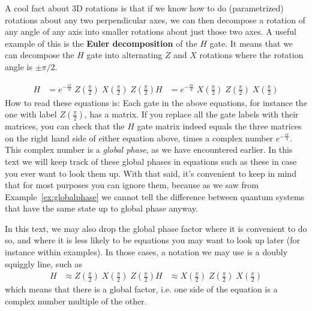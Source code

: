 \documentclass{article}
\theoremstyle{definition}
\begin{document}
A cool fact about 3D rotations is that if we know how to do (parametrized) rotations about any two perpendicular axes, we can then decompose a rotation of any angle of any axis into smaller rotations about just those two axes.
A useful example of this is the \textbf{Euler decomposition} of the $H$ gate.  It means that we can decompose the $H$ gate into alternating $Z$ and $X$ rotations where the rotation angle is $\pm \pi/2$.

\begin{align}
	H &= e^{-\frac{i\pi}{4}} \; Z\left(\frac{\pi}{2}\right) \; X\left(\frac{\pi}{2}\right) \; Z\left(\frac{\pi}{2}\right)
	H &= e^{-\frac{i\pi}{4}} \; X\left(\frac{\pi}{2}\right) \; Z\left(\frac{\pi}{2}\right) \; X\left(\frac{\pi}{2}\right)
\end{align}
How to read these equations is: Each gate in the above equations, for instance the one with label $Z\left(\frac{\pi}{2}\right)$, has a matrix.
If you replace all the gate labels with their matrices, you can check that the $H$ gate matrix indeed equals the three matrices on the right hand side of either equation above, times a complex number $e^{-\frac{i\pi}{4}}$.  This complex number is a \textit{global phase}, as we have encountered earlier.  In this text we will keep track of these global phases in equations such as these in case you ever want to look them up.  With that said, it's convenient to keep in mind that for most purposes you can ignore them, because as we saw from Example~\ref{ex:globalphase} we cannot tell the difference between quantum systems that have the same state up to global phase anyway.

In this text, we may also drop the global phase factor where it is convenient to do so, and where it is less likely to be equations you may want to look up later (for instance within examples).  In those cases, a notation we may use is a doubly squiggly line, such as
\begin{align}
	H &\approx Z\left(\frac{\pi}{2}\right) \; X\left(\frac{\pi}{2}\right) \; Z\left(\frac{\pi}{2}\right)
	H &\approx X\left(\frac{\pi}{2}\right) \; Z\left(\frac{\pi}{2}\right) \; X\left(\frac{\pi}{2}\right)
\end{align}
which means that there is a global factor, i.e. one side of the equation is a complex number multiple of the other.
\end{document}
